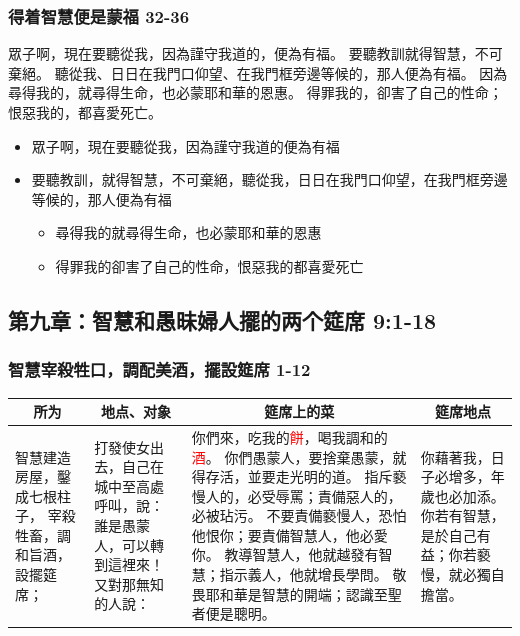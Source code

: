 \subsubsection{得着智慧便是蒙福 32-36}
眾子啊，現在要聽從我，因為謹守我道的，便為有福。
要聽教訓就得智慧，不可棄絕。
聽從我、日日在我門口仰望、在我門框旁邊等候的，那人便為有福。
因為尋得我的，就尋得生命，也必蒙耶和華的恩惠。
得罪我的，卻害了自己的性命；恨惡我的，都喜愛死亡。
\begin{itemize}
\itemsep-.45em  
\item 眾子啊，現在要聽從我，因為謹守我道的便為有福
\item 要聽教訓，就得智慧，不可棄絕，聽從我，日日在我門口仰望，在我門框旁邊等候的，那人便為有福
\begin{itemize}
\itemsep-.45em  
\item 尋得我的就尋得生命，也必蒙耶和華的恩惠
\item 得罪我的卻害了自己的性命，恨惡我的都喜愛死亡
\end{itemize}
\end{itemize}











\subsection{第九章：智慧和愚昧婦人擺的两个筵席  9:1-18}
\subsubsection{智慧宰殺牲口，調配美酒，擺設筵席 1-12}
\begin{table}[H]
\hspace{-1.cm}
\centering
\begin{tabular}{p{}|p{3cm}|p{9.5cm}|p{3.00cm}}\hline\hline
\multicolumn{1}{c|}{所为}&\multicolumn{1}{c|}{地点、对象}&\multicolumn{1}{c|}{筵席上的菜}&\multicolumn{1}{c}{筵席地点}\\\hline
智慧建造房屋，鑿成七根柱子，
宰殺牲畜，調和旨酒，設擺筵席；
&打發使女出去，自己在城中至高處呼叫，說：誰是愚蒙人，可以轉到這裡來！又對那無知的人說：
&你們來，吃我的\textcolor{red}{餅}，喝我調和的\textcolor{red}{酒}。
你們愚蒙人，要捨棄愚蒙，就得存活，並要走光明的道。
指斥褻慢人的，必受辱罵；責備惡人的，必被玷污。
不要責備褻慢人，恐怕他恨你；要責備智慧人，他必愛你。
教導智慧人，他就越發有智慧；指示義人，他就增長學問。
敬畏耶和華是智慧的開端；認識至聖者便是聰明。
&你藉著我，日子必增多，年歲也必加添。
你若有智慧，是於自己有益；你若褻慢，就必獨自擔當。\\\hline
\end{tabular}
\end{table} 

